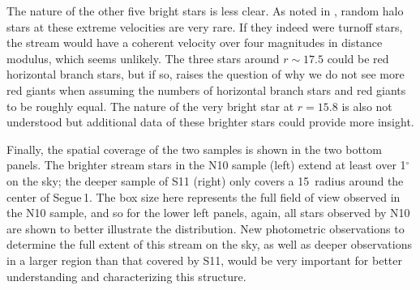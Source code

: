 \documentclass{emulateapj}
\begin{document}
The nature of the other five bright stars is less clear. As noted in
\citet{Geha2009}, random halo stars at these extreme velocities are
very rare. If they indeed were turnoff stars, the stream would have a
coherent velocity over four magnitudes in distance modulus, which
seems unlikely. The three stars around $r\sim 17.5$ could be red
horizontal branch stars, but if so, raises the question of why we do
not see more red giants when assuming the numbers of horizontal branch stars
and red giants to be roughly equal. The nature of the very bright star
at $r = 15.8$ is also not understood but additional data of these
brighter stars could provide more insight.

Finally, the spatial coverage of the two samples is shown in the two
bottom panels. The brighter stream stars in the N10 sample (left)
extend at least over 1$^{\circ}$ on the sky; the deeper sample of S11
(right) only covers a 15\arcmin\, radius around the center of
Segue\,1. The box size here represents the full field of view observed
in the N10 sample, and so for the lower left panels, again, all stars
observed by N10 are shown to better illustrate the
distribution. New photometric observations to determine the full extent of
this stream on the sky, as well as deeper observations in a larger
region than that covered by S11, would be very important for better
understanding and characterizing this structure.
\end{document}
